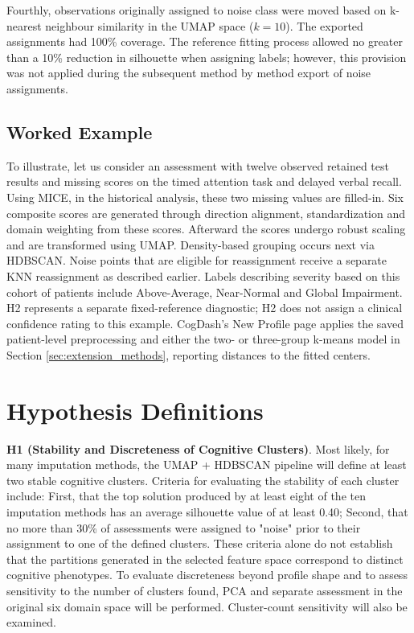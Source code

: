 Fourthly, observations originally assigned to noise class were moved based on k-nearest neighbour similarity in the UMAP space (\(k = 10\)). The exported assignments had 100\% coverage. The reference fitting process allowed no greater than a 10\% reduction in silhouette when assigning labels; however, this provision was not applied during the subsequent method by method export of noise assignments.

\subsection{Worked Example}
To illustrate, let us consider an assessment with twelve observed retained test results and missing scores on the timed attention task and delayed verbal recall. Using MICE, in the historical analysis, these two missing values are filled-in. Six composite scores are generated through direction alignment, standardization and domain weighting from these scores. Afterward the scores undergo robust scaling and are transformed using UMAP. Density-based grouping occurs next via HDBSCAN. Noise points that are eligible for reassignment receive a separate KNN reassignment as described earlier. Labels describing severity based on this cohort of patients include Above-Average, Near-Normal and Global Impairment. H2 represents a separate fixed-reference diagnostic; H2 does not assign a clinical confidence rating to this example. CogDash's New Profile page applies the saved patient-level preprocessing and either the two- or three-group k-means model in Section \ref{sec:extension_methods}, reporting distances to the fitted centers.

\section{Hypothesis Definitions}\label{sec:hypotheses}
\textbf{H1 (Stability and Discreteness of Cognitive Clusters)}. Most likely, for many imputation methods, the UMAP + HDBSCAN pipeline will define at least two stable cognitive clusters. Criteria for evaluating the stability of each cluster include: First, that the top solution produced by at least eight of the ten imputation methods has an average silhouette value of at least 0.40; Second, that no more than 30\% of assessments were assigned to "noise" prior to their assignment to one of the defined clusters. These criteria alone do not establish that the partitions generated in the selected feature space correspond to distinct cognitive phenotypes. To evaluate discreteness beyond profile shape and to assess sensitivity to the number of clusters found, PCA and separate assessment in the original six domain space will be performed. Cluster-count sensitivity will also be examined.

